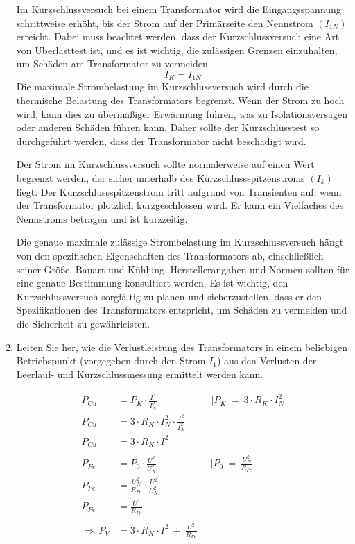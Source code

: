 \begin{enumerate}[label=\alph*)]
	      Im Kurzschlussversuch bei einem Transformator wird die Eingangsspannung
	      schrittweise erhöht, bis der Strom auf der Primärseite den Nennstrom $(I_{1N})$
	      erreicht. Dabei muss beachtet werden, dass der Kurzschlussversuch eine Art von
	      Überlasttest ist, und es ist wichtig, die zulässigen Grenzen einzuhalten, um
	      Schäden am Transformator zu vermeiden.
	      \[ I_K = I_{1N} \]
	      Die maximale Strombelastung im Kurzschlussversuch wird durch die thermische
	      Belastung des Transformators begrenzt. Wenn der Strom zu hoch wird, kann dies
	      zu übermäßiger Erwärmung führen, was zu Isolationsversagen oder anderen Schäden
	      führen kann. Daher sollte der Kurzschlusstest so durchgeführt werden, dass der
	      Transformator nicht beschädigt wird.

	      Der Strom im Kurzschlussversuch sollte normalerweise auf einen Wert begrenzt
	      werden, der sicher unterhalb des Kurzschlussspitzenstroms $(I_{k})$ liegt. Der
	      Kurzschlussspitzenstrom tritt aufgrund von Transienten auf, wenn der
	      Transformator plötzlich kurzgeschlossen wird. Er kann ein Vielfaches des
	      Nennstroms betragen und ist kurzzeitig.

	      Die genaue maximale zulässige Strombelastung im Kurzschlussversuch hängt von
	      den spezifischen Eigenschaften des Transformators ab, einschließlich seiner
	      Größe, Bauart und Kühlung. Herstellerangaben und Normen sollten für eine genaue
	      Bestimmung konsultiert werden. Es ist wichtig, den Kurzschlussversuch
	      sorgfältig zu planen und sicherzustellen, dass er den Spezifikationen des
	      Transformators entspricht, um Schäden zu vermeiden und die Sicherheit zu
	      gewährleisten.

	\item Leiten Sie her, wie die Verlustleistung des Transformators in einem beliebigen
	      Betriebspunkt (vorgegeben durch den Strom $I_1$) aus den Verlusten der
	      Leerlauf- und Kurzschlussmessung ermittelt werden kann.

		  \begin{align*}
		      P_{Cu}               & = P_K\cdot \frac{I^2}{I^2_N}\mspace{100mu} |P_K\ =\ 3\cdot R_K\cdot I^2_N \\
		      P_{Cu}               & = 3\cdot R_K\cdot I^2_N\cdot \frac{I^2}{I^2_N}                            \\
		      P_{Cu}               & = 3\cdot R_K\cdot I^2                                                     \\
		      \\
		      P_{Fe}               & = P_0\cdot \frac{U^2}{U^2_N}\mspace{100mu} |P_0\ =\ \frac{U^2_N}{R_{Fe}}  \\
		      P_{Fe}               & = \frac{U^2_N}{R_{Fe}}\cdot \frac{U^2}{U^2_N}                             \\
		      P_{Fe}               & = \frac{U^2}{R_{Fe}}                                                      \\
		      \\
		      \Longrightarrow\ P_V & = 3\cdot R_K\cdot I^2\ +\ \frac{U^2}{R_{Fe}}
	      \end{align*}


\end{enumerate}

